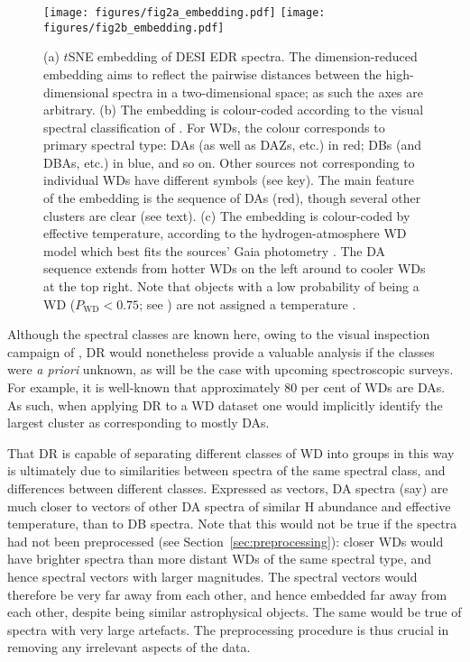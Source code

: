 \documentclass[fleqn,usenatbib]{mnras}
\begin{document}
\begin{figure*}
    \centering
\texttt{[image: figures/fig2a\_embedding.pdf]}
\texttt{[image: figures/fig2b\_embedding.pdf]}
\caption{
    (a) $t$SNE embedding of DESI EDR spectra.
    The dimension-reduced embedding aims to reflect the pairwise distances between the high-dimensional spectra in a two-dimensional space; as such the axes are arbitrary.
    (b) The embedding is colour-coded according to the visual spectral classification of \citet{manser24}.
    For WDs, the colour corresponds to primary spectral type: DAs (as well as DAZs, etc.) in red; DBs (and DBAs, etc.) in blue, and so on.
    Other sources not corresponding to individual WDs have different symbols (see key).
    The main feature of the embedding is the sequence of DAs (red), though several other clusters are clear (see text).
    (c) The embedding is colour-coded by effective temperature, according to the hydrogen-atmosphere WD model which best fits the sources' Gaia photometry \citep{gentilefusillo19}.
    The DA sequence extends from hotter WDs on the left around to cooler WDs at the top right.
    Note that objects with a low probability of being a WD ($P_\mathrm{WD} < 0.75$; see \citealt{gentilefusillo15}) are not assigned a temperature \citep{gentilefusillo19}.
}
\label{fig:full_spectra}
\end{figure*}

Although the spectral classes are known here, owing to the visual inspection campaign of \citet{manser24}, DR would nonetheless provide a valuable analysis if the classes were \textit{a priori} unknown, as will be the case with upcoming spectroscopic surveys.
For example, it is well-known that approximately 80 per cent of WDs are DAs.
As such, when applying DR to a WD dataset one would implicitly identify the largest cluster as corresponding to mostly DAs.

That DR is capable of separating different classes of WD into groups in this way is ultimately due to similarities between spectra of the same spectral class, and differences between different classes.
Expressed as vectors, DA spectra (say) are much closer to vectors of other DA spectra of similar H abundance and effective temperature, than to DB spectra.
Note that this would not be true if the spectra had not been preprocessed (see Section~\ref{sec:preprocessing}): closer WDs would have brighter spectra than more distant WDs of the same spectral type, and hence spectral vectors with larger magnitudes.
The spectral vectors would therefore be very far away from each other, and hence embedded far away from each other, despite being similar astrophysical objects.
The same would be true of spectra with very large artefacts.
The preprocessing procedure is thus crucial in removing any irrelevant aspects of the data.
\end{document}
